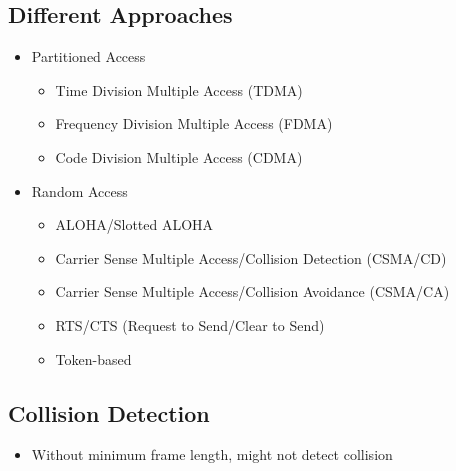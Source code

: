 \subsection{Different Approaches}
\begin{itemize}
    \item Partitioned Access
          \begin{itemize}
              \item Time Division Multiple Access (TDMA)
              \item Frequency Division Multiple Access (FDMA)
              \item Code Division Multiple Access (CDMA)
          \end{itemize}
    \item Random Access
          \begin{itemize}
              \item ALOHA/Slotted ALOHA
              \item Carrier Sense Multiple Access/Collision Detection (CSMA/CD)
              \item Carrier Sense Multiple Access/Collision Avoidance (CSMA/CA)
              \item RTS/CTS (Request to Send/Clear to Send)
              \item Token-based
          \end{itemize}
\end{itemize}

\subsection{Collision Detection}
\begin{itemize}
    \item Without minimum frame length, might not detect collision
\end{itemize}
